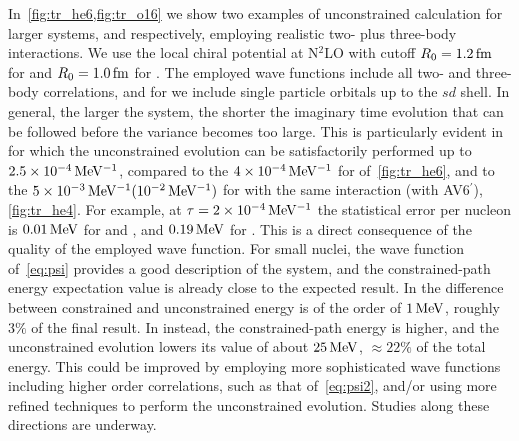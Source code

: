 \documentclass[aps,prc,twocolumn,superscriptaddress,floatfix]{revtex4-1}
\begin{document}
In~\cref{fig:tr_he6,fig:tr_o16} we show two examples of unconstrained calculation for larger systems,
 and  respectively, employing realistic two- plus three-body interactions. 
We use the local chiral potential at N$^2$LO with cutoff $R_0=1.2\,\rm fm$ for 
 and $R_0=1.0\,\rm fm$ for . The employed wave functions include 
all two- and three-body correlations, and for  we include single particle orbitals 
up to the $sd$ shell. In general, the larger the system, the shorter 
the imaginary time evolution that can be followed before the variance becomes 
too large. 
This is particularly evident in  for which the unconstrained evolution 
can be satisfactorily performed up to $2.5\times10^{-4}\,\rm MeV^{-1}$, 
compared to the $4\times10^{-4}\,\rm MeV^{-1}$
for  of~\cref{fig:tr_he6}, and to the $5\times10^{-3}\,\rm MeV^{-1}(10^{-2}\,\rm MeV^{-1})$ 
for  with the same interaction (with AV6$^\prime$), \cref{fig:tr_he4}.
For example, at $\tau=2\times10^{-4}\,\rm MeV^{-1}$ the statistical error per nucleon is  
$0.01\,\rm MeV$ for  and , and $0.19\,\rm MeV$ for .
This is a direct consequence of the quality of the employed wave function. 
For small nuclei, the wave function of~\cref{eq:psi} provides a good description of the
system, and the constrained-path energy expectation value is already close to the expected result. 
In  the difference between constrained and unconstrained energy is of 
the order of $1\,\rm MeV$, roughly $3\%$ of the final result. 
In  instead, the constrained-path energy is higher, 
and the unconstrained evolution lowers 
its value of about $25\,\rm MeV$, $\approx22\%$ of the total energy.
This could be improved by employing more sophisticated wave functions including higher order
correlations, such as that of~\cref{eq:psi2}, 
and/or using more refined techniques to perform the unconstrained evolution. 
Studies along these directions are underway.
\end{document}
